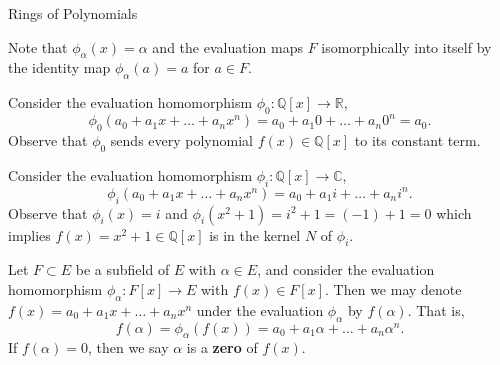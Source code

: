 \begin{section}{Rings of Polynomials}
\begin{rmk}
Note that $\phi_{\alpha}(x) = \alpha$ and the evaluation maps $F$ isomorphically into itself by the identity map $\phi_{\alpha}(a) = a$ for $a \in F$.
\end{rmk}

\begin{ex}
Consider the evaluation homomorphism $\phi_{0} \colon \mathbb{Q}[x] \to \mathbb{R}$,
$$\phi_{0}(a_{0} + a_{1}x + \dots + a_{n}x^{n}) = a_{0} + a_{1}0 + \dots + a_{n}0^{n} = a_{0}.$$
Observe that $\phi_{0}$ sends every polynomial $f(x) \in \mathbb{Q}[x]$ to its constant term.
\end{ex}

\begin{ex}
Consider the evaluation homomorphism $\phi_{i} \colon \mathbb{Q}[x] \to \mathbb{C}$,
$$\phi_{i}(a_{0} + a_{1}x + \dots + a_{n}x^{n}) = a_{0} + a_{1}i + \dots + a_{n}i^{n}.$$
Observe that $\phi_{i}(x) = i$ and $\phi_{i}(x^{2} + 1) = i^{2} + 1 = (-1) + 1 = 0$ which implies $f(x) = x^{2} + 1 \in \mathbb{Q}[x]$ is in the kernel $N$ of $\phi_{i}$.
\end{ex}

\begin{defn}
Let $F \subset E$ be a subfield of $E$ with $\alpha \in E$, and consider the evaluation homomorphism $\phi_{\alpha} \colon F[x] \to E$ with $f(x) \in F[x]$. Then we may denote $f(x) = a_{0} + a_{1}x + \dots + a_{n}x^{n}$ under the evaluation $\phi_{\alpha}$ by $f(\alpha)$. That is,
$$f(\alpha) = \phi_{\alpha}(f(x)) = a_{0} + a_{1}\alpha + \dots + a_{n}\alpha^{n}.$$
If $f(\alpha) = 0$, then we say $\alpha$ is a {\bf zero} of $f(x)$.
\end{defn}
\end{section}